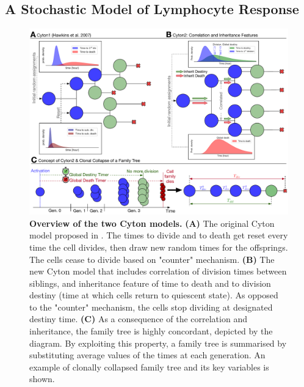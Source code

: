 \documentclass[11pt, a4paper]{article}
\begin{document}
\subsection{A Stochastic Model of Lymphocyte Response}
\label{sec:model_definition}
\begin{figure}[t]
    \centering
    \includegraphics[scale=0.5]{figs/fig1.pdf}
    \caption{\textbf{Overview of the two Cyton models.} \textbf{(A)} The original Cyton model proposed in \cite{Hawkins.2007}. The times to divide and to death get reset every time the cell divides, then draw new random times for the offsprings. The cells cease to divide based on "counter" mechanism. \textbf{(B)} The new Cyton model that includes correlation of division times between siblings, and inheritance feature of time to death and to division destiny (time at which cells return to quiescent state). As opposed to the "counter" mechanism, the cells stop dividing at designated destiny time. \textbf{(C)} As a consequence of the correlation and inheritance, the family tree is highly concordant, depicted by the diagram. By exploiting this property, a family tree is summarised by substituting average values of the times at each generation. An example of clonally collapsed family tree and its key variables is shown.}
    \label{fig:model}
\end{figure}
\end{document}
